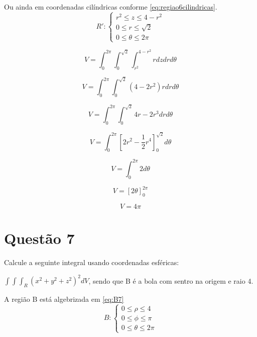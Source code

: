 \documentclass[10pt,a4paper]{article}
\begin{document}
	Ou ainda em coordenadas cilíndricas conforme \ref{eq:regiao6cilindricas}.
	\begin{equation}\label{eq:regiao6cilindricas}
		R':
		\begin{cases}
			r^2 \le z \le 4 - r^2\\
			0 \le r \le \sqrt{2}\\
			0 \le \theta \le 2\pi
		\end{cases}
	\end{equation}
	
	\begin{equation*}
		V = \int_{0}^{2\pi} \int_{0}^{\sqrt{2}} \int_{r^2}^{4 - r^2} r dz dr d\theta
	\end{equation*}
	
	\begin{equation*}
		V = \int_{0}^{2\pi} \int_{0}^{\sqrt{2}} (4 - 2r^2)r dr d\theta
	\end{equation*}
	
	\begin{equation*}
		V = \int_{0}^{2\pi} \int_{0}^{\sqrt{2}} 4r - 2r^3 dr d\theta
	\end{equation*}
	
	\begin{equation*}
		V = \int_{0}^{2\pi} \left[2r^2 - \frac{1}{2}r^4\right]_0^{\sqrt{2}} d\theta
	\end{equation*}
	
	\begin{equation*}
		V = \int_{0}^{2\pi} 2 d\theta
	\end{equation*}

	\begin{equation*}
		V = \left[2 \theta\right]_0^{2\pi}
	\end{equation*}
	
	\begin{equation*}
		V = 4\pi
	\end{equation*}

	\section*{Questão 7}
	
	Calcule a seguinte integral usando coordenadas esféricas:
	
	$ \int \int \int_R (x^2 + y^2 + z^2)^2 dV $, sendo que B é a bola com sentro na origem e raio 4.
	
	A região B está algebrizada em \ref{eq:B7}
	\begin{equation}\label{eq:B7}
		B:
		\begin{cases}
		0 \le \rho \le 4\\
		0 \le \phi \le \pi \\
		0 \le \theta \le 2\pi
		\end{cases}
	\end{equation}
	
\end{document}

